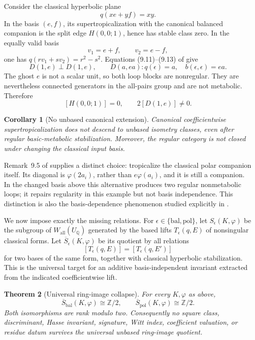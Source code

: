 \documentclass[11pt]{article}
\newtheorem{theorem}{Theorem}[section]
\newtheorem{corollary}[theorem]{Corollary}
\theoremstyle{definition}
\theoremstyle{remark}
\newcommand{\Integers}{\mathbb Z}
\newcommand{\Rationals}{\mathbb Q}
\begin{document}
Consider the classical hyperbolic plane
\[
 q(xe+yf)=xy.
\]
In the basis \((e,f)\), its supertropicalization with the canonical balanced
companion is the split edge \(H(0,0;1)\), hence has stable class zero.  In the
equally valid basis
\[
 v_1=e+f,\qquad v_2=e-f,
\]
one has \(q(rv_1+sv_2)=r^2-s^2\).  Equations (9.11)--(9.13) of
\cite{ikr2016qf1} give
\[
 D(1,e)\perp D(1,e),
 \qquad D(a,ea): q(\epsilon)=a,\quad b(\epsilon,\epsilon)=ea.
\]
The ghost \(e\) is not a scalar unit, so both loop blocks are nonregular.
They are nevertheless connected generators in the all-pairs group and are
not metabolic.  Therefore
\[
 [H(0,0;1)]=0,
 \qquad 2[D(1,e)]\ne0.
\]

\begin{corollary}[No unbased canonical extension]\label{cor:nofunctor}
Canonical coefficientwise supertropicalization does not descend to unbased
isometry classes, even after regular basic-metabolic stabilization.  Moreover,
the regular category is not closed under changing the classical input basis.
\end{corollary}

Remark~9.5 of \cite{ikr2016qf1} supplies a distinct choice: tropicalize the
classical polar companion itself.  Its diagonal is \(\varphi(2a_i)\), rather
than \(e\varphi(a_i)\), and it is still a companion.  In the changed basis
above this alternative produces two regular nonmetabolic loops; it repairs
regularity in this example but not basis independence.  This distinction is
also the basis-dependence phenomenon studied explicitly in
\cite[Section~8]{ikr2018qf2}.

We now impose exactly the missing relations.  For
\(\epsilon\in\{\mathrm{bal},\mathrm{pol}\}\), let
\(S_\epsilon(K,\varphi)\) be the subgroup of
\(W_{\mathrm{all}}(U_{\Rationals})\) generated by the based lifts
\(T_\epsilon(q,E)\) of nonsingular classical forms.  Let
\(\overline S_\epsilon(K,\varphi)\) be its quotient by all relations
\[
 [T_\epsilon(q,E)]=[T_\epsilon(q,E')]
\]
for two bases of the same form, together with classical hyperbolic
stabilization.  This is the universal target for an additive
basis-independent invariant extracted from the indicated coefficientwise
lift.

\begin{theorem}[Universal ring-image collapse]\label{thm:ringcollapse}
For every \(K,\varphi\) as above,
\[
 \overline S_{\mathrm{bal}}(K,\varphi)\cong\Integers/2,
 \qquad
 \overline S_{\mathrm{pol}}(K,\varphi)\cong\Integers/2.
\]
Both isomorphisms are rank modulo two.  Consequently no square class,
discriminant, Hasse invariant, signature, Witt index, coefficient valuation,
or residue datum survives the universal unbased ring-image quotient.
\end{theorem}
\end{document}
